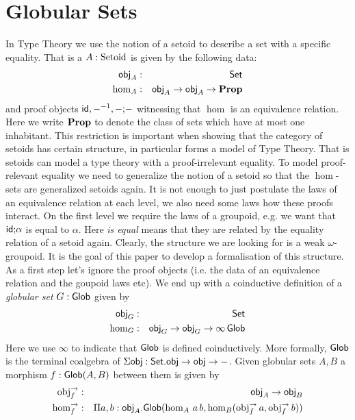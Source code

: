 \section{Globular Sets}


In Type Theory we use the notion of a setoid to describe a set with a
specific equality. That is a $A : \mathrm{Setoid}$ is given by the
following data:
\begin{eqnarray*}
  \mathsf{obj}_A & : & \mathsf{Set} \\
  \hom_A & : & \mathsf{obj}_A \rightarrow \mathsf{obj}_A \rightarrow \mathbf{Prop}
\end{eqnarray*}
and proof objects $\mathsf{id}, {-}^{-1}, - \text{;} -$ witnessing that $\hom$ is an
equivalence relation. Here we write $\mathbf{Prop}$ to denote the class of sets
which have at most one inhabitant. This restriction is important when
showing that the category of setoids has certain structure, in
particular forms a model of Type Theory. That is setoids can model a
type theory with a proof-irrelevant equality. To model proof-relevant
equality we need to generalize the notion of a setoid so that the
$\hom$-sets are generalized setoids again. It is not enough to just
postulate the laws of an equivalence relation at each level, we also
need some laws how these proofs interact. On the first level we
require the laws of a groupoid, e.g. we want that $\mathsf{id} \text{;} \alpha$ is
equal to $\alpha$. Here \emph{is equal} means that they are related by the
equality relation of a setoid again. Clearly, the structure we are
looking for is a weak $\omega$-groupoid. It is the goal of this paper
to develop a formalisation of this structure. As a first step let's
ignore the proof objects (i.e. the data of an equivalence relation and
the goupoid laws etc).
We end up with a coinductive definition of a \emph{globular set} $G :
\mathsf{Glob}$ given by
\begin{eqnarray*}
  \mathsf{obj}_G & : & \mathsf{Set} \\
  \hom_G & : & \mathsf{obj}_G \rightarrow \mathsf{obj}_G \rightarrow \infty\,\mathsf{Glob}
\end{eqnarray*}
Here we use $\infty$ to indicate that $\mathsf{Glob}$ is defined
coinductively. More formally, $\mathsf{Glob}$ is the terminal coalgebra of
$\Sigma \mathsf{obj} : \mathsf{Set}. \mathsf{obj} \rightarrow \mathsf{obj} \rightarrow -$. Given globular sets
$A,B$ a morphism $f : \mathsf{Glob}(A , B)$ between them is given by 
\begin{eqnarray*}
  \mathrm{obj}^{\rightarrow}_f & : & \mathsf{obj}_A \rightarrow \mathsf{obj}_B \\
  \mathrm{hom}^{\rightarrow}_f & : & \Pi a,b:\mathsf{obj}_A. \mathsf{Glob}(\hom_A\,a\,b,\hom_B(\mathrm{obj}^{\rightarrow}_f\,a,\mathrm{obj}^{\rightarrow}_f\,b))
\end{eqnarray*}
